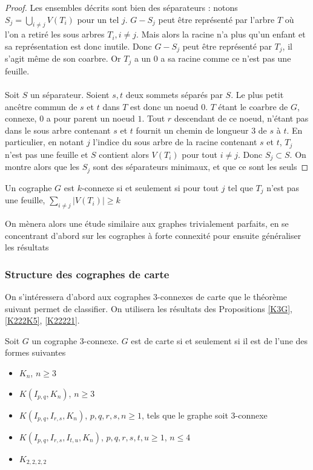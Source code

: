 \documentclass{scrartcl}
\begin{document}
\begin{flushleft}
\begin{proof}
    Les ensembles décrits sont bien des séparateurs : notons $\displaystyle S_j = \bigcup_{i \neq j} V(T_i)$ pour un tel $j$. $G - S_j$ peut être
    représenté par l'arbre $T$ où l'on a retiré les sous arbres $T_i, i \neq j$. Mais alors la racine n'a plus qu'un enfant et sa représentation est donc
    inutile. Donc $G - S_j$ peut être représenté par $T_j$, il s'agit même de son coarbre. Or $T_j$ a un $0$ a sa racine comme ce n'est pas une feuille.
    \\~\\
    Soit $S$ un séparateur. Soient $s, t$ deux sommets séparés par $S$. Le plus petit ancêtre commun de $s$ et $t$ dans $T$
    est donc un noeud $0$. $T$ étant le coarbre de $G$, connexe, $0$ a pour parent un noeud $1$. Tout $r$ descendant de ce noeud, n'étant pas dans le
    sous arbre contenant $s$ et $t$ fournit un chemin de longueur $3$ de $s$ à $t$. En particulier, en notant $j$ l'indice du sous arbre de la racine
    contenant $s$ et $t$, $T_j$ n'est pas une feuille et $S$ contient alors $V(T_i)$ pour tout $i \neq j$. Donc $S_j \subset S$. On montre
    alors que les $S_j$ sont des séparateurs minimaux, et que ce sont les seuls
\end{proof}

\begin{cor}\label{coarbrekconn}
    Un cographe $G$ est $k$-connexe si et seulement si pour tout $j$ tel que $T_j$ n'est pas une feuille, $\sum_{i \neq j} |V(T_i)| \geq k$
\end{cor}

On mènera alors une étude similaire aux graphes trivialement parfaits, en se concentrant d'abord sur les cographes à forte connexité pour ensuite
généraliser les résultats

\subsubsection{Structure des cographes de carte}

On s'intéressera d'abord aux cographes $3$-connexes de carte que le théorème suivant permet de classifier. On utilisera les résultats
des Propositions \ref{K3G}, \ref{K222K5}, \ref{K22221}.

\begin{theorem}\label{cograph3conn}
    Soit $G$ un cographe $3$-connexe. $G$ est de carte si et seulement si il est de l'une des formes suivantes
    \begin{itemize}
        \item $K_n$, $n \geq 3$
        \item $K(I_{p,q}, K_n)$, $n \geq 3$
        \item $K(I_{p,q}, I_{r,s}, K_n)$, $p,q,r,s,n \geq 1$, tels que le graphe soit $3$-connexe
        \item $K(I_{p,q}, I_{r,s}, I_{t,u}, K_n)$, $p,q,r,s,t,u \geq 1$, $n \leq 4$
        \item $K_{2,2,2,2}$
    \end{itemize}
\end{theorem}


\end{flushleft}
\end{document}
